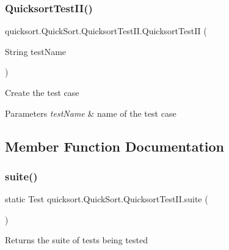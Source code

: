 \subsubsection{\texorpdfstring{Quicksort\+Test\+I\+I()}{QuicksortTestII()}}
{\footnotesize\ttfamily quicksort.\+Quick\+Sort.\+Quicksort\+Test\+I\+I.\+Quicksort\+Test\+II (\begin{DoxyParamCaption}\item[{String}]{test\+Name }\end{DoxyParamCaption})}

Create the test case


\begin{DoxyParams}{Parameters}
{\em test\+Name} & name of the test case \\
\hline
\end{DoxyParams}


\subsection{Member Function Documentation}
\hypertarget{classquicksort_1_1_quick_sort_1_1_quicksort_test_i_i_a8e8b2645a480a690df591548c89c5245}{}\label{classquicksort_1_1_quick_sort_1_1_quicksort_test_i_i_a8e8b2645a480a690df591548c89c5245} 
\subsubsection{\texorpdfstring{suite()}{suite()}}
{\footnotesize\ttfamily static Test quicksort.\+Quick\+Sort.\+Quicksort\+Test\+I\+I.\+suite (\begin{DoxyParamCaption}{ }\end{DoxyParamCaption})\hspace{0.3cm}{\ttfamily [static]}}

\begin{DoxyReturn}{Returns}
the suite of tests being tested 
\end{DoxyReturn}
\hypertarget{classquicksort_1_1_quick_sort_1_1_quicksort_test_i_i_a6fd2e0679470e8845e27c1c08cc03af0}{}\label{classquicksort_1_1_quick_sort_1_1_quicksort_test_i_i_a6fd2e0679470e8845e27c1c08cc03af0} 
